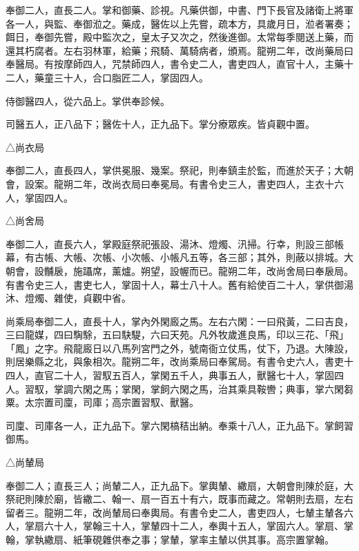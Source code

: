\begin{pinyinscope}
 奉御二人，直長二人。掌和御藥、診視。凡藥供御，中書、門下長官及諸衛上將軍各一人，與監、奉御涖之。藥成，醫佐以上先嘗，疏本方，具歲月日，涖者署奏；餌日，奉御先嘗，殿中監次之，皇太子又次之，然後進御。太常每季閱送上藥，而還其朽腐者。左右羽林軍，給藥；飛騎、萬騎病者，頒焉。龍朔二年，改尚藥局曰奉醫局。有按摩師四人，咒禁師四人，書令史二人，書吏四人，直官十人，主藥十二人，藥童三十人，合口脂匠二人，掌固四人。



 侍御醫四人，從六品上。掌供奉診候。



 司醫五人，正八品下；醫佐十人，正九品下。掌分療眾疾。皆貞觀中置。



 △尚衣局



 奉御二人，直長四人，掌供冕服、幾案。祭祀，則奉鎮圭於監，而進於天子；大朝會，設案。龍朔二年，改尚衣局曰奉冕局。有書令史三人，書吏四人，主衣十六人，掌固四人。



 △尚舍局



 奉御二人，直長六人，掌殿庭祭祀張設、湯沐、燈燭、汛掃。行幸，則設三部帳幕，有古帳、大帳、次帳、小次帳、小帳凡五等，各三部；其外，則蔽以排城。大朝會，設黼扆，施躡席，薰爐。朔望，設幄而已。龍朔二年，改尚舍局曰奉扆局。有書令史三人，書吏七人，掌固十人，幕士八十人。舊有給使百二十人，掌供御湯沐、燈燭、雜使，貞觀中省。



 尚乘局奉御二人，直長十人，掌內外閑廄之馬。左右六閑：一曰飛黃，二曰吉良，三曰龍媒，四曰騊駼，五曰駃騠，六曰天苑。凡外牧歲進良馬，印以三花、「飛」「鳳」之字。飛龍廄日以八馬列宮門之外，號南衙立仗馬，仗下，乃退。大陳設，則居樂縣之北，與象相次。龍朔二年，改尚乘局曰奉駕局。有書令史六人，書吏十四人，直官二十人，習馭五百人，掌閑五千人，典事五人，獸醫七十人，掌固四人。習馭，掌調六閑之馬；掌閑，掌飼六閑之馬，治其乘具鞍轡；典事，掌六閑芻粟。太宗置司廩，司庫；高宗置習馭、獸醫。



 司廩、司庫各一人，正九品下。掌六閑槁秸出納。奉乘十八人，正九品下。掌飼習御馬。



 △尚輦局



 奉御二人；直長三人；尚輦二人，正九品下。掌輿輦、繖扇，大朝會則陳於庭，大祭祀則陳於廟，皆繖二、翰一、扇一百五十有六，既事而藏之。常朝則去扇，左右留者三。龍朔二年，改尚輦局曰奉輿局。有書令史二人，書吏四人，七輦主輦各六人，掌扇六十人，掌翰三十人，掌輦四十二人，奉輿十五人，掌固六人。掌扇、掌翰，掌執繖扇、紙筆硯雜供奉之事；掌輦，掌率主輦以供其事。高宗置掌翰。




\end{pinyinscope}
